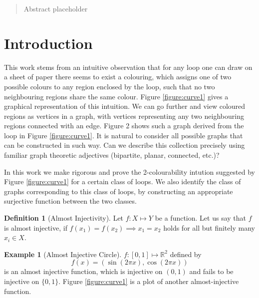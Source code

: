 \documentclass{article}
\theoremstyle{definition}
\newtheorem{definition}{Definition}
\theoremstyle{definition}
\newtheorem{example}{Example}
\theoremstyle{plain}
\begin{document}

\begin{abstract}
Abstract placeholder
\end{abstract}


\section{Introduction}
This work stems from an intuitive observation that for any loop one can draw on a sheet of paper there seems to exist a colouring, which assigns one of two possible colours to any region enclosed by the loop, such that no two neighbouring regions share the same colour. Figure \ref{figure:curve1} gives a graphical representation of this intuition. We can go further and view coloured regions as vertices in a graph, with vertices representing any two neighbouring regions connected with an edge. Figure 2 shows such a graph derived from the loop in Figure \ref{figure:curve1}. It is natural to consider all possible graphs that can be constructed in such way. Can we describe this collection precisely using familiar graph theoretic adjectives (bipartite, planar, connected, etc.)?

In this work we make rigorous and prove the 2-colourability intution suggested by Figure \ref{figure:curve1} for a certain class of loops. We also identify the class of graphs corresponding to this class of loops, by constructing an appropriate surjective function between the two classes.

\begin{definition}[Almost Injectivity]
Let $f: X \mapsto Y$ be a function. Let us say that $f$ is almost injective, if $f(x_{1})=f(x_{2}) \implies x_{1} = x_{2}$ holds for all but finitely many $x_{i}\in X$.
\end{definition}

\begin{example}[Almost Injective Circle]\label{example:AIC}
$f: [0, 1] \mapsto \mathbb{R}^2$ defined by $$f(x) = (\sin(2 \pi x), \cos(2 \pi x))$$ is an almost injective function, which is injective on $(0, 1)$ and fails to be injective on $\{0, 1\}$. Figure \ref{figure:curve1} is a plot of another almost-injective function.
\end{example}
\end{document}
